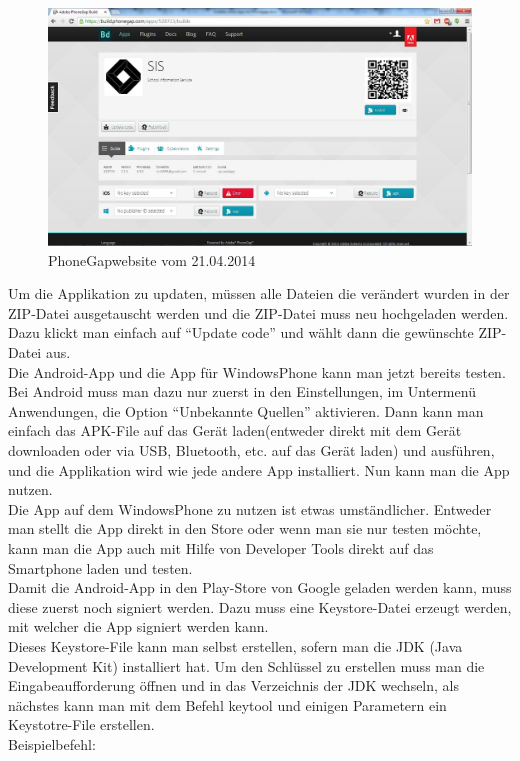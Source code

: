 \begin{figure}[H]
\includegraphics[keepaspectratio=true, width=14cm]{images/phoneGap/PhoneGap2.png}
\caption{PhoneGapwebsite vom 21.04.2014}
\end{figure}

Um die Applikation zu updaten, müssen alle Dateien die verändert wurden in der ZIP-Datei ausgetauscht werden und die ZIP-Datei muss neu hochgeladen werden. Dazu klickt man einfach auf \enquote{Update code} und wählt dann die gewünschte ZIP-Datei aus.\\
Die Android-App und die App für WindowsPhone kann man jetzt bereits testen. Bei Android muss man dazu nur zuerst in den Einstellungen, im Untermenü Anwendungen, die Option \enquote{Unbekannte Quellen} aktivieren. Dann kann man einfach das APK-File auf das Gerät laden(entweder direkt mit dem Gerät downloaden oder via USB, Bluetooth, etc. auf das Gerät laden) und ausführen, und die Applikation wird wie jede andere App installiert. Nun kann man die App nutzen.\\
Die App auf dem WindowsPhone zu nutzen ist etwas umständlicher. Entweder man stellt die App direkt in den Store oder wenn man sie nur testen möchte, kann man die App auch mit Hilfe von Developer Tools direkt auf das Smartphone laden und testen.\\
Damit die Android-App in den Play-Store von Google geladen werden kann, muss diese zuerst noch signiert werden. Dazu muss eine Keystore-Datei erzeugt werden, mit welcher die App signiert werden kann.\\
Dieses Keystore-File kann man selbst erstellen, sofern man die JDK (Java Development Kit) installiert hat. Um den Schlüssel zu erstellen muss man die Eingabeaufforderung öffnen und in das Verzeichnis der JDK wechseln, als nächstes kann man mit dem Befehl keytool und einigen Parametern ein Keystotre-File erstellen.\\
Beispielbefehl:\\

